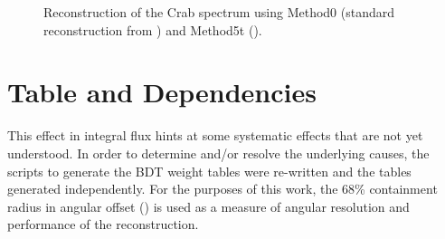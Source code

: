 \documentclass[main.tex]{subfiles}
\begin{document}
\begin{figure}[H]
  \begin{center}
  \end{center}
  \caption[Crab spectrum reconstruction.]{Reconstruction of the Crab spectrum using Method0 (standard reconstruction from \vegas) and Method5t (\disp).}
  \label{fig:spectrum_compare}
\end{figure}

\section{\disp Table and \rse Dependencies}
This effect in integral flux hints at some systematic effects that are not yet understood. In order to determine and/or resolve the underlying causes, the scripts to generate the BDT weight tables were re-written and the tables generated independently. For the purposes of this work, the 68\% containment radius in angular offset (\rse\hspace{-4pt}) is used as a measure of angular resolution and performance of the reconstruction.
\end{document}
